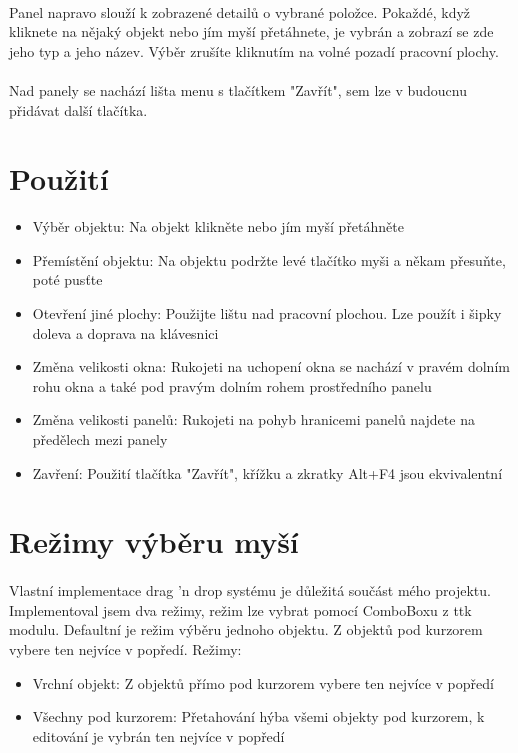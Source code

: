 \documentclass[12pt,a4paper]{report}
\begin{document}
\paragraph{} Panel napravo slouží k zobrazené detailů o vybrané položce. Pokaždé, když kliknete na nějaký objekt nebo jím myší přetáhnete, je vybrán a zobrazí se zde jeho typ a jeho název. Výběr zrušíte kliknutím na volné pozadí pracovní plochy.
\paragraph{} Nad panely se nachází lišta menu s tlačítkem "Zavřít", sem lze v budoucnu přidávat další tlačítka.

\newpage \section{Použití}
\begin{itemize}
    \item Výběr objektu: Na objekt klikněte nebo jím myší přetáhněte
    \item Přemístění objektu: Na objektu podržte levé tlačítko myši a někam přesuňte, poté pusťte
    \item Otevření jiné plochy: Použijte lištu nad pracovní plochou. Lze použít i šipky doleva a doprava na klávesnici
    \item Změna velikosti okna: Rukojeti na uchopení okna se nachází v pravém dolním rohu okna a také pod pravým dolním rohem prostředního panelu
    \item Změna velikosti panelů: Rukojeti na pohyb hranicemi panelů najdete na předělech mezi panely
    \item Zavření: Použití tlačítka "Zavřít", křížku a zkratky Alt+F4 jsou ekvivalentní
\end{itemize}

\section{Režimy výběru myší}
\paragraph{} Vlastní implementace drag 'n drop systému je důležitá součást mého projektu. Implementoval jsem dva režimy, režim lze vybrat pomocí ComboBoxu z ttk modulu. Defaultní je režim výběru jednoho objektu. Z objektů pod kurzorem vybere ten nejvíce v popředí. Režimy:
\begin{itemize}
    \item Vrchní objekt: Z objektů přímo pod kurzorem vybere ten nejvíce v popředí
    \item Všechny pod kurzorem: Přetahování hýba všemi objekty pod kurzorem, k editování je vybrán ten nejvíce v popředí
\end{itemize}
\end{document}
